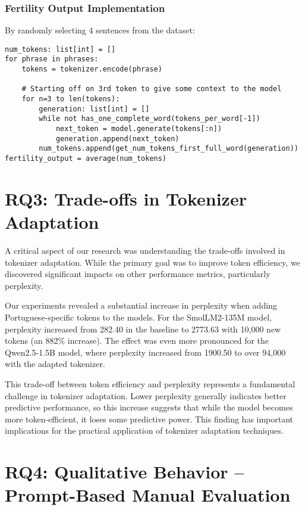 \subsubsection{Fertility Output Implementation}
By randomly selecting 4 sentences from the \cite{calamept_reference} dataset:
\begin{lstlisting}
num_tokens: list[int] = []
for phrase in phrases:
    tokens = tokenizer.encode(phrase)
    
    # Starting off on 3rd token to give some context to the model
    for n=3 to len(tokens):
        generation: list[int] = []
        while not has_one_complete_word(tokens_per_word[-1])
            next_token = model.generate(tokens[:n])
            generation.append(next_token)
        num_tokens.append(get_num_tokens_first_full_word(generation))
fertility_output = average(num_tokens)
\end{lstlisting}

\section{RQ3: Trade-offs in Tokenizer Adaptation}
\label{sec:tradeoffs}

A critical aspect of our research was understanding the trade-offs involved in tokenizer adaptation. While the primary goal was to improve token efficiency, we discovered significant impacts on other performance metrics, particularly perplexity.

Our experiments revealed a substantial increase in perplexity when adding Portuguese-specific tokens to the models. For the SmolLM2-135M model, perplexity increased from 282.40 in the baseline to 2773.63 with 10,000 new tokens (an 882\% increase). The effect was even more pronounced for the Qwen2.5-1.5B model, where perplexity increased from 1900.50 to over 94,000 with the adapted tokenizer.

This trade-off between token efficiency and perplexity represents a fundamental challenge in tokenizer adaptation. Lower perplexity generally indicates better predictive performance, so this increase suggests that while the model becomes more token-efficient, it loses some predictive power. This finding has important implications for the practical application of tokenizer adaptation techniques.

\section{RQ4: Qualitative Behavior – Prompt-Based Manual Evaluation}
\label{sec:manual_eval}

